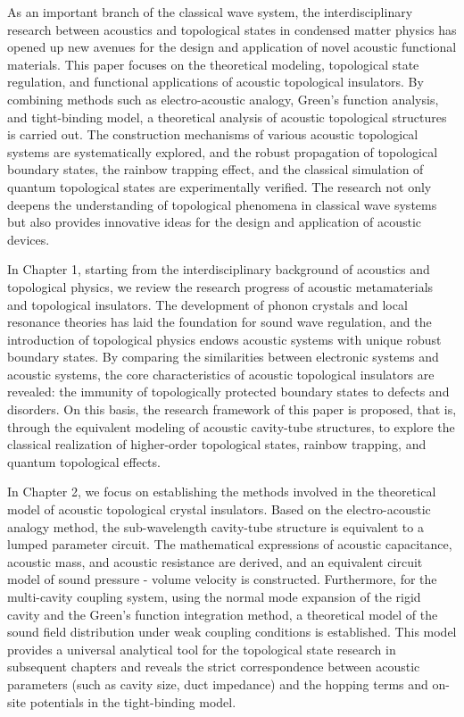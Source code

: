 \documentclass[
    type = doctor,
  ]{njuthesis}
\begin{document}
\begin{abstract*}
  As an important branch of the classical wave system, the interdisciplinary research between acoustics and topological states in condensed matter physics has opened up new avenues for the design and application of novel acoustic functional materials. This paper focuses on the theoretical modeling, topological state regulation, and functional applications of acoustic topological insulators. By combining methods such as electro-acoustic analogy, Green's function analysis, and tight-binding model, a theoretical analysis of acoustic topological structures is carried out. The construction mechanisms of various acoustic topological systems are systematically explored, and the robust propagation of topological boundary states, the rainbow trapping effect, and the classical simulation of quantum topological states are experimentally verified. The research not only deepens the understanding of topological phenomena in classical wave systems but also provides innovative ideas for the design and application of acoustic devices.

  In Chapter 1, starting from the interdisciplinary background of acoustics and topological physics, we review the research progress of acoustic metamaterials and topological insulators. The development of phonon crystals and local resonance theories has laid the foundation for sound wave regulation, and the introduction of topological physics endows acoustic systems with unique robust boundary states. By comparing the similarities between electronic systems and acoustic systems, the core characteristics of acoustic topological insulators are revealed: the immunity of topologically protected boundary states to defects and disorders. On this basis, the research framework of this paper is proposed, that is, through the equivalent modeling of acoustic cavity-tube structures, to explore the classical realization of higher-order topological states, rainbow trapping, and quantum topological effects.
  
  In Chapter 2, we focus on establishing the methods involved in the theoretical model of acoustic topological crystal insulators. Based on the electro-acoustic analogy method, the sub-wavelength cavity-tube structure is equivalent to a lumped parameter circuit. The mathematical expressions of acoustic capacitance, acoustic mass, and acoustic resistance are derived, and an equivalent circuit model of sound pressure - volume velocity is constructed. Furthermore, for the multi-cavity coupling system, using the normal mode expansion of the rigid cavity and the Green's function integration method, a theoretical model of the sound field distribution under weak coupling conditions is established. This model provides a universal analytical tool for the topological state research in subsequent chapters and reveals the strict correspondence between acoustic parameters (such as cavity size, duct impedance) and the hopping terms and on-site potentials in the tight-binding model.
  

\end{abstract*}
\end{document}
